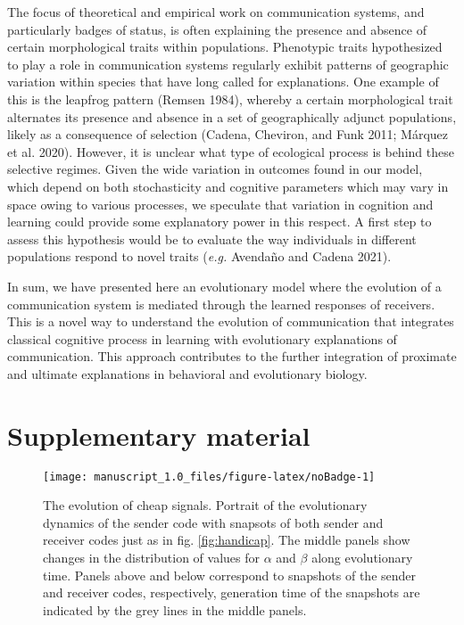\documentclass[
  12pt,
]{article}
\newcommand{\beginsupplement}{ \setcounter{table}{0}            
  \renewcommand{\thetable}{S\arabic{table}}\setcounter{figure}{0} \renewcommand{\thefigure}{S\arabic{figure}}}
\begin{document}
The focus of theoretical and empirical work on communication systems,
and particularly badges of status, is often explaining the presence and
absence of certain morphological traits within populations. Phenotypic
traits hypothesized to play a role in communication systems regularly
exhibit patterns of geographic variation within species that have long
called for explanations. One example of this is the leapfrog pattern
(Remsen 1984), whereby a certain morphological trait alternates its
presence and absence in a set of geographically adjunct populations,
likely as a consequence of selection (Cadena, Cheviron, and Funk 2011;
Márquez et al. 2020). However, it is unclear what type of ecological
process is behind these selective regimes. Given the wide variation in
outcomes found in our model, which depend on both stochasticity and
cognitive parameters which may vary in space owing to various processes,
we speculate that variation in cognition and learning could provide some
explanatory power in this respect. A first step to assess this
hypothesis would be to evaluate the way individuals in different
populations respond to novel traits (\emph{e.g.} Avendaño and Cadena
2021).

In sum, we have presented here an evolutionary model where the evolution
of a communication system is mediated through the learned responses of
receivers. This is a novel way to understand the evolution of
communication that integrates classical cognitive process in learning
with evolutionary explanations of communication. This approach
contributes to the further integration of proximate and ultimate
explanations in behavioral and evolutionary biology.

\hypertarget{supplementary-material}{%
\section{Supplementary material}\label{supplementary-material}}

\beginsupplement

\begin{figure}

{\centering \texttt{[image: manuscript\_1.0\_files/figure-latex/noBadge-1]} 

}

\caption{The evolution of cheap signals. Portrait of the evolutionary dynamics of the sender code with snapsots of both sender and receiver codes just as in fig. \ref{fig:handicap}. The middle panels show changes in the distribution of values for $\alpha$ and $\beta$ along evolutionary time. Panels above and below correspond to snapshots of the sender and receiver codes, respectively, generation time of the snapshots are indicated by the grey lines in the middle panels.}\label{fig:noBadge}
\end{figure}
\end{document}

